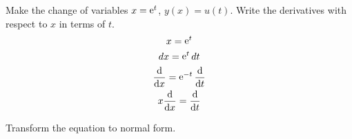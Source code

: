 {%
\begin{Hint}
  \label{hint x2yaxyay=0}
  Make the change of variables $x = \mathop{\mathrm{e}}\nolimits^t$, $y(x) = u(t)$.
  Write the derivatives with respect to $x$ in terms of $t$.
  \begin{gather*}
    x = \mathop{\mathrm{e}}\nolimits^t \\
    d x = \mathop{\mathrm{e}}\nolimits^t d t \\
    \frac{\mathrm{d}}{\mathrm{d} x} = \mathop{\mathrm{e}}\nolimits^{-t} \frac{\mathrm{d}}{\mathrm{d} t} \\
    x \frac{\mathrm{d}}{\mathrm{d} x} = \frac{\mathrm{d}}{\mathrm{d} t}
  \end{gather*}
\end{Hint}




\begin{Hint}
  \label{hint y1xy114x2y=0}
  Transform the equation to normal form.
\end{Hint}






\raggedbottom
}
